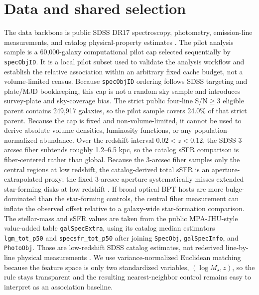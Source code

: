 \documentclass[twocolumn]{aastex631}
\begin{document}
\section{Data and shared selection}
The data backbone is public SDSS DR17 spectroscopy, photometry, emission-line measurements, and catalog physical-property estimates \citep{york2000,sdssdr17,brinchmann2004}. The pilot analysis sample is a 60,000-galaxy computational pilot cap selected sequentially by \texttt{specObjID}. It is a local pilot subset used to validate the analysis workflow and establish the relative association within an arbitrary fixed cache budget, not a volume-limited census. Because \texttt{specObjID} ordering follows SDSS targeting and plate/MJD bookkeeping, this cap is not a random sky sample and introduces survey-plate and sky-coverage bias. The strict public four-line S/N$\geq3$ eligible parent contains 249,917 galaxies, so the pilot sample covers 24.0\% of that strict parent. Because the cap is fixed and non-volume-limited, it cannot be used to derive absolute volume densities, luminosity functions, or any population-normalized abundance.
Over the redshift interval $0.02<z<0.12$, the SDSS 3-arcsec fiber subtends roughly 1.2--6.5 kpc, so the catalog sSFR comparison is fiber-centered rather than global.
Because the 3-arcsec fiber samples only the central regions at low redshift, the catalog-derived total sSFR is an aperture-extrapolated proxy; the fixed 3-arcsec aperture systematically misses extended star-forming disks at low redshift \citep{kewley2005}. If broad optical BPT hosts are more bulge-dominated than the star-forming controls, the central fiber measurement can inflate the observed offset relative to a galaxy-wide star-formation comparison.
The stellar-mass and sSFR values are taken from the public MPA-JHU-style value-added table \texttt{galSpecExtra}, using its catalog median estimators \texttt{lgm\_tot\_p50} and \texttt{specsfr\_tot\_p50} after joining \texttt{SpecObj}, \texttt{galSpecInfo}, and \texttt{PhotoObj}. Those are low-redshift SDSS catalog estimates, not rederived line-by-line physical measurements \citep{brinchmann2004,sdssdr17,york2000}. We use variance-normalized Euclidean matching because the feature space is only two standardized variables, $(\log M_\star,z)$, so the rule stays transparent and the resulting nearest-neighbor control remains easy to interpret as an association baseline.
\end{document}
